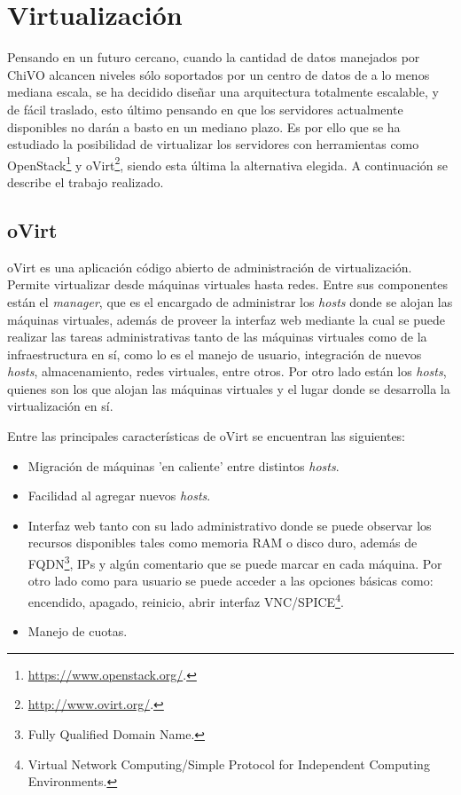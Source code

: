 \section{Virtualización}\label{anx:virtualizacion}

Pensando en un futuro cercano, cuando la cantidad de datos manejados por ChiVO alcancen niveles sólo soportados por un centro de datos de a lo menos mediana escala, se ha decidido diseñar una arquitectura totalmente escalable, y de fácil traslado, esto último pensando en que los servidores actualmente disponibles no darán a basto en un mediano plazo. Es por ello que se ha estudiado la posibilidad de virtualizar los servidores con herramientas como OpenStack\footnote{\url{https://www.openstack.org/}.} y oVirt\footnote{\url{http://www.ovirt.org/}.}, siendo esta última la alternativa elegida. A continuación se describe el trabajo realizado.

\subsection*{oVirt}

oVirt es una aplicación código abierto de administración de virtualización. Permite virtualizar desde máquinas virtuales hasta redes. Entre sus componentes están el \emph{manager}, que es el encargado de administrar los \emph{hosts} donde se alojan las máquinas virtuales, además de proveer la interfaz web mediante la cual se puede realizar las tareas administrativas tanto de las máquinas virtuales como de la infraestructura en sí, como lo es el manejo de usuario, integración de nuevos \emph{hosts}, almacenamiento, redes virtuales, entre otros. Por otro lado están los \emph{hosts}, quienes son los que alojan las máquinas virtuales y el lugar donde se desarrolla la virtualización en sí.

Entre las principales características de oVirt se encuentran las siguientes:

\begin{itemize}
	\item Migración de máquinas 'en caliente’ entre distintos \emph{hosts}.
	\item Facilidad al agregar nuevos \emph{hosts}.
	\item Interfaz web tanto con su lado administrativo donde se puede observar los recursos disponibles tales como memoria RAM o disco duro, además de FQDN\footnote{Fully Qualified Domain Name.}, IPs y algún comentario que se puede marcar en cada máquina. Por otro lado como para usuario se puede acceder a las opciones básicas como: encendido, apagado, reinicio, abrir interfaz VNC/SPICE\footnote{Virtual Network Computing/Simple Protocol for Independent Computing Environments.}.
	\item Manejo de cuotas.
\end{itemize}

